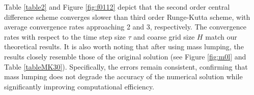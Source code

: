 \documentclass[preprint,12pt]{elsarticle}
\begin{document}
Table \ref{table2} and Figure \ref{fig:f0112} depict that the second order central difference scheme converges slower than third order Runge-Kutta scheme, with average convergence rates approaching 2 and 3, respectively. The convergence rates with respect to the time step size $\tau$ and coarse grid size $H$ match our theoretical results.
It is also worth noting that after using mass lumping, the results closely resemble those of the original solution (see Figure \ref{fig:m0l} and Table \ref{tableMK30}). Specifically, the errors remain consistent, confirming that mass lumping does not degrade the accuracy of the numerical solution while significantly improving computational efficiency.
\end{document}
